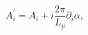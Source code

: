 \begin{equation}
A_i^{\prime }=A_i+i\frac{2\pi }{L_p}\partial _i\alpha ,  \label{U1trans}
\end{equation}

